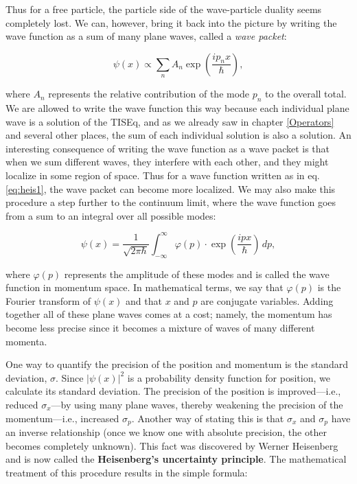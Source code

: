 \documentclass[
  9pt,
]{extbook}
\theoremstyle{definition}
\theoremstyle{definition}
\theoremstyle{definition}
\theoremstyle{remark}
\begin{document}
Thus for a free particle, the particle side of the wave-particle duality seems completely lost. We can, however, bring it back into the picture by writing the wave function as a sum of many plane waves, called a \emph{wave packet}:

\begin{equation} 
\psi (x)\propto \sum _{n}A_{n}\exp\left(\frac{ip_n x}{\hbar} \right),
\label{eq:heis1}  
\end{equation}

where \(A_n\) represents the relative contribution of the mode \(p_n\) to the overall total. We are allowed to write the wave function this way because each individual plane wave is a solution of the TISEq, and as we already saw in chapter \ref{Operators} and several other places, the sum of each individual solution is also a solution. An interesting consequence of writing the wave function as a wave packet is that when we sum different waves, they interfere with each other, and they might localize in some region of space. Thus for a wave function written as in eq. \eqref{eq:heis1}, the wave packet can become more localized. We may also make this procedure a step further to the continuum limit, where the wave function goes from a sum to an integral over all possible modes:

\begin{equation}
\psi (x)=\frac {1}{\sqrt{2\pi\hbar}}\int_{-\infty }^{\infty }\varphi (p)\cdot \exp
\left(\frac{ip x}{\hbar} \right)\,dp,
\label{eq:heis2}  
\end{equation}

where \(\varphi(p)\) represents the amplitude of these modes and is called the wave function in momentum space. In mathematical terms, we say that \(\varphi (p)\) is the Fourier transform of \(\psi (x)\) and that \(x\) and \(p\) are conjugate variables. Adding together all of these plane waves comes at a cost; namely, the momentum has become less precise since it becomes a mixture of waves of many different momenta.

One way to quantify the precision of the position and momentum is the standard deviation, \(\sigma\). Since \(|\psi (x)|^{2}\) is a probability density function for position, we calculate its standard deviation. The precision of the position is improved---i.e., reduced \(\sigma_x\)---by using many plane waves, thereby weakening the precision of the momentum---i.e., increased \(\sigma_p\). Another way of stating this is that \(\sigma_x\) and \(\sigma_p\) have an inverse relationship (once we know one with absolute precision, the other becomes completely unknown). This fact was discovered by Werner Heisenberg and is now called the \textbf{Heisenberg's uncertainty principle}. The mathematical treatment of this procedure results in the simple formula:
\end{document}
